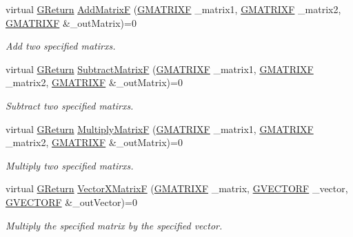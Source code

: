 \begin{DoxyCompactItemize}
\item 
virtual \hyperlink{namespaceGW_a67a839e3df7ea8a5c5686613a7a3de21}{G\+Return} \hyperlink{classGW_1_1MATH_1_1GMatrix_a40f37f26a141222068d55994b8161cde}{Add\+MatrixF} (\hyperlink{structGW_1_1MATH_1_1GMATRIXF}{G\+M\+A\+T\+R\+I\+XF} \+\_\+matrix1, \hyperlink{structGW_1_1MATH_1_1GMATRIXF}{G\+M\+A\+T\+R\+I\+XF} \+\_\+matrix2, \hyperlink{structGW_1_1MATH_1_1GMATRIXF}{G\+M\+A\+T\+R\+I\+XF} \&\+\_\+out\+Matrix)=0
\begin{DoxyCompactList}\small\item\em Add two specified matirxs. \end{DoxyCompactList}\item 
virtual \hyperlink{namespaceGW_a67a839e3df7ea8a5c5686613a7a3de21}{G\+Return} \hyperlink{classGW_1_1MATH_1_1GMatrix_a0b744e7f36718b8cccf2423c88c43a30}{Subtract\+MatrixF} (\hyperlink{structGW_1_1MATH_1_1GMATRIXF}{G\+M\+A\+T\+R\+I\+XF} \+\_\+matrix1, \hyperlink{structGW_1_1MATH_1_1GMATRIXF}{G\+M\+A\+T\+R\+I\+XF} \+\_\+matrix2, \hyperlink{structGW_1_1MATH_1_1GMATRIXF}{G\+M\+A\+T\+R\+I\+XF} \&\+\_\+out\+Matrix)=0
\begin{DoxyCompactList}\small\item\em Subtract two specified matirxs. \end{DoxyCompactList}\item 
virtual \hyperlink{namespaceGW_a67a839e3df7ea8a5c5686613a7a3de21}{G\+Return} \hyperlink{classGW_1_1MATH_1_1GMatrix_a03ca7a7e5ad97849b9867d0210aa4bc0}{Multiply\+MatrixF} (\hyperlink{structGW_1_1MATH_1_1GMATRIXF}{G\+M\+A\+T\+R\+I\+XF} \+\_\+matrix1, \hyperlink{structGW_1_1MATH_1_1GMATRIXF}{G\+M\+A\+T\+R\+I\+XF} \+\_\+matrix2, \hyperlink{structGW_1_1MATH_1_1GMATRIXF}{G\+M\+A\+T\+R\+I\+XF} \&\+\_\+out\+Matrix)=0
\begin{DoxyCompactList}\small\item\em Multiply two specified matirxs. \end{DoxyCompactList}\item 
virtual \hyperlink{namespaceGW_a67a839e3df7ea8a5c5686613a7a3de21}{G\+Return} \hyperlink{classGW_1_1MATH_1_1GMatrix_a8e1b421243bebab184ca0237e163fa2d}{Vector\+X\+MatrixF} (\hyperlink{structGW_1_1MATH_1_1GMATRIXF}{G\+M\+A\+T\+R\+I\+XF} \+\_\+matrix, \hyperlink{structGW_1_1MATH_1_1GVECTORF}{G\+V\+E\+C\+T\+O\+RF} \+\_\+vector, \hyperlink{structGW_1_1MATH_1_1GVECTORF}{G\+V\+E\+C\+T\+O\+RF} \&\+\_\+out\+Vector)=0
\begin{DoxyCompactList}\small\item\em Multiply the specified matrix by the specified vector. \end{DoxyCompactList}\item 

\end{DoxyCompactItemize}
